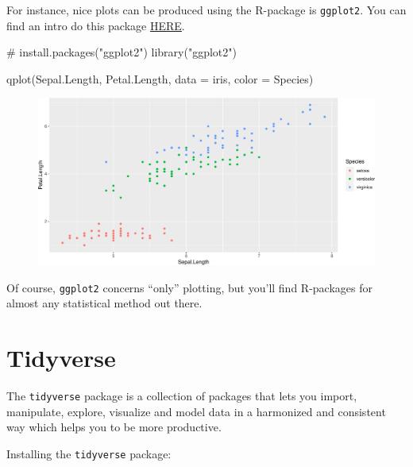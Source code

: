 \documentclass[
  letterpaper,
  DIV=11,
  numbers=noendperiod]{scrreprt}
\newenvironment{Shaded}{\begin{snugshade}}{\end{snugshade}}
\newcommand{\AttributeTok}[1]{\textcolor[rgb]{0.40,0.45,0.13}{#1}}
\newcommand{\CommentTok}[1]{\textcolor[rgb]{0.37,0.37,0.37}{#1}}
\newcommand{\FunctionTok}[1]{\textcolor[rgb]{0.28,0.35,0.67}{#1}}
\newcommand{\NormalTok}[1]{\textcolor[rgb]{0.00,0.23,0.31}{#1}}
\newcommand{\StringTok}[1]{\textcolor[rgb]{0.13,0.47,0.30}{#1}}
\theoremstyle{definition}
\theoremstyle{plain}
\theoremstyle{plain}
\theoremstyle{remark}
\begin{document}
For instance, nice plots can be produced using the R-package is
\texttt{ggplot2}. You can find an intro do this package
\href{http://ggplot2.tidyverse.org/}{HERE}.

\begin{Shaded}
\begin{Highlighting}[]
\CommentTok{\# install.packages("ggplot2")}
\FunctionTok{library}\NormalTok{(}\StringTok{"ggplot2"}\NormalTok{)}

\FunctionTok{qplot}\NormalTok{(Sepal.Length, Petal.Length, }\AttributeTok{data =}\NormalTok{ iris, }\AttributeTok{color =}\NormalTok{ Species)}
\end{Highlighting}
\end{Shaded}

\begin{figure}[H]

{\centering \includegraphics{./01-Introduction-to-R_files/figure-pdf/unnamed-chunk-32-1.pdf}

}

\end{figure}

\hfill\break

Of course, \texttt{ggplot2} concerns ``only'' plotting, but you'll find
R-packages for almost any statistical method out there.

\hypertarget{tidyverse}{%
\section{Tidyverse}\label{tidyverse}}

The \texttt{tidyverse} package is a collection of packages that lets you
import, manipulate, explore, visualize and model data in a harmonized
and consistent way which helps you to be more productive.

Installing the \texttt{tidyverse} package:
\end{document}

